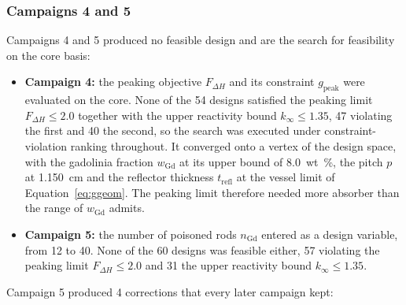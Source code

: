 \subsubsection{Campaigns 4 and 5}
\label{sec:res-hist-c4c5}
\label{sec:res-c4-c5}\label{sec:res-c4}\label{tab:c4-doe}\label{fig:c4traj}\label{fig:c4vertex}\label{sec:res-c5}\label{tab:kbasis-sweep}\label{tab:c5-mp}\label{sec:res-campaign5}\label{eq:pins-needed}\label{tab:c5}\label{fig:c5pins}\label{sec:res-c5-search}\label{eq:violation-normalised}\label{fig:c5traj}\label{fig:c5lobes}\label{sec:res-c5-corrected}\label{fig:c5objcorr}\label{tab:c5-champions}\label{eq:kmin-selfcons}\label{sec:res-c5-kbasis}\label{fig:c5kbasis}\label{tab:c5-sweep}\label{sec:c5_confirmation}\label{tab:c5_confirmation}\label{fig:restart_defect}\label{tab:restart_experiment}

Campaigns 4 and 5 produced no feasible design and are the search for
feasibility on the core basis:

\begin{itemize}
  \item \textbf{Campaign 4:} the peaking objective $F_{\Delta H}$ and
        its constraint $g_\mathrm{peak}$ were evaluated on the core. None
        of the 54 designs satisfied the peaking limit
        $F_{\Delta H} \le 2.0$ together with the upper reactivity bound
        $k_\infty \le 1.35$, 47 violating the first and 40 the second, so
        the search was executed under constraint-violation ranking throughout. It
        converged onto a vertex of the design space, with the gadolinia
        fraction $w_\mathrm{Gd}$ at its upper bound of \SI{8.0}{wt\%},
        the pitch $p$ at \SI{1.150}{cm} and the reflector thickness
        $t_\mathrm{refl}$ at the vessel limit of
        Equation~\eqref{eq:ggeom}. The peaking limit therefore needed
        more absorber than the range of $w_\mathrm{Gd}$ admits.

  \item \textbf{Campaign 5:} the number of poisoned rods $n_\mathrm{Gd}$
        entered as a design variable, from 12 to 40. None of the 60
        designs was feasible either, 57 violating the peaking limit
        $F_{\Delta H} \le 2.0$ and 31 the upper reactivity bound
        $k_\infty \le 1.35$.
\end{itemize}

Campaign 5 produced 4 corrections that every later campaign kept:

